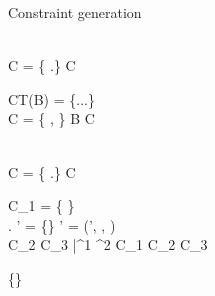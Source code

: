 \begin{figure*}[t]

\caption{Constraint generation}
\label{fig:constraint-gen}
\end{figure*}

\begin{figure*}[t]
\\


  {
    C = \{ \rgn \in \A.\rhoenv \}
  }
  {
    \typeok {\A} {\ObjZ\inang{\rgn}} {C}
  }

  {
    CT(B) = \{...\}
    \spc
    \\
    C = \{ \rbar \in \rhoenv, \isvalid{\phicx}{[\rbar/\rhobar, \tbar/\bar{\tyvar}](\phi)} \}
  }
  {
    \typeok {(\rhoenv,\aenv,\phicx)} {B\inang{\rbar}\inang{\tbar}} {C}
  }

  {
     \spc
     \spc
    \\
    C = \{ \rgn \in \A.\rhoenv \}
  }
  {
     {C}
  }

  {
    C_1 = \{ \rgn \in \rhoenv \}
    \\
    \rhobar \notin \A.\rhoenv \spc
    \rhoenv' = \rhoenv \cup \{\rhobar\} \spc
    \A' = (\rhoenv', \aenv, \phicx \conj \phi)
    \\
    \spc 
     {C_2} \spc
     {C_3}
  }
  {
    \typeok{(\rhoenv,\aenv,\phicx)} {\inang{\rhobar \,|\, \phi} \bar{\tau^1} \xrightarrow{\rgn} \tau^2} 
       {C_1 \cup C_2 \cup C_3}
  }

  { 
  }
  {
    \typeok {\A} {\RgnZ{}\inang{\toprgn}} {\{\}}
  }


\end{figure*}
